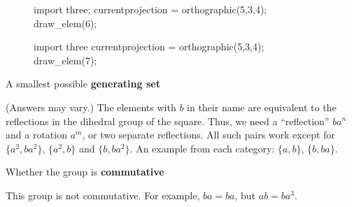\documentclass[../gatm_answers.tex]{subfiles}
\begin{document}
\begin{figure}[h]
	\begin{center}
		\begin{minipage}[b]{0.45\textwidth}
			\centering
			\begin{asy}[width=0.65\textwidth]
				import three;
				currentprojection = orthographic(5,3,4);
				draw_elem(6);
			\end{asy}
		\end{minipage}
		\hfill
		\begin{minipage}[b]{0.45\textwidth}
			\centering
			\begin{asy}[width=0.7\textwidth]
				import three
				currentprojection = orthographic(5,3,4);
				draw_elem(7);
			\end{asy}
		\end{minipage}
	\end{center}
	\vspace*{-2\baselineskip}
	\begin{center}
		\begin{minipage}[t]{\textwidth}
			\label{fig:this_took_me_so_long}
		\end{minipage}
	\end{center}
	\vspace*{-2\baselineskip}
\end{figure}

\begin{inner_problem}
\item A smallest possible \textbf{generating set}
\end{inner_problem}

\noindent(Answers may vary.)
The elements with $b$ in their name are equivalent to the reflections in the dihedral group of the square. Thus, we need a ``reflection'' $ba^n$ and a rotation $a^m$, or two separate reflections. All such pairs work except for $\{a^2,ba^2\}$, $\{a^2,b\}$ and $\{b,ba^2\}$. An example from each category: $\{a,b\}$, $\{b,ba\}$.

\begin{inner_problem}
\item Whether the group is \textbf{commutative}
\end{inner_problem}

\noindent This group is not commutative. For example, $ba=ba$, but $ab=ba^3$.
\end{document}
